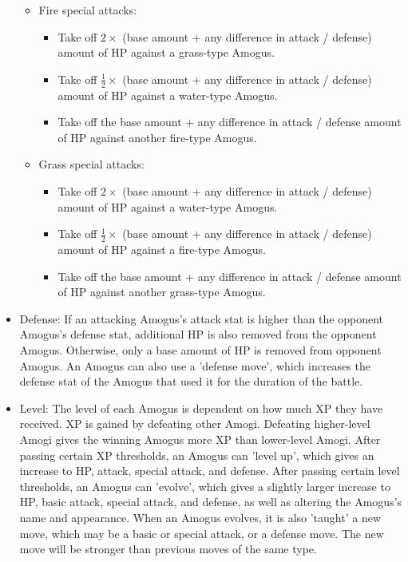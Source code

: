 \documentclass{article}
\begin{document}
\begin{itemize}
\begin{itemize}
\begin{itemize}
          \end{itemize}
        \item Fire special attacks:
          \begin{itemize}
            \item Take off $2\times$ (base amount + any difference in attack / defense) amount of HP against a grass-type Amogus.
            \item Take off $\frac{1}{2}\times{}$ (base amount + any difference in attack / defense) amount of HP against a water-type Amogus.
            \item Take off the base amount + any difference in attack / defense amount of HP against another fire-type Amogus.
          \end{itemize}
        \item Grass special attacks:
          \begin{itemize}
            \item Take off $2\times$ (base amount + any difference in attack / defense) amount of HP against a water-type Amogus.
            \item Take off $\frac{1}{2}\times{}$ (base amount + any difference in attack / defense) amount of HP against a fire-type Amogus.
            \item Take off the base amount + any difference in attack / defense amount of HP against another grass-type Amogus.
          \end{itemize}
      \end{itemize}
    \item Defense: If an attacking Amogus's attack stat is higher than the opponent Amogus's defense stat, additional HP is also removed from the opponent Amogus. Otherwise, only a base amount of HP is removed from opponent Amogus. An Amogus can also use a 'defense move', which increases the defense stat of the Amogus that used it for the duration of the battle. 
    \item Level: The level of each Amogus is dependent on how much XP they have received. XP is gained by defeating other Amogi. Defeating higher-level Amogi gives the winning Amogus more XP than lower-level Amogi. After passing certain XP thresholds, an Amogus can 'level up', which gives an increase to HP, attack, special attack, and defense. After passing certain level thresholds, an Amogus can 'evolve', which gives a slightly larger increase to HP, basic attack, special attack, and defense, as well as altering the Amogus's name and appearance. When an Amogus evolves, it is also 'taught' a new move, which may be a basic or special attack, or a defense move. The new move will be stronger than previous moves of the same type.
  \end{itemize}
  
\end{document}
